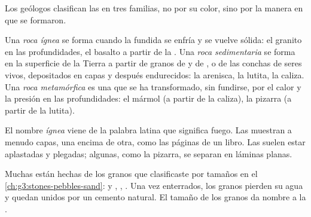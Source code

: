 Los geólogos clasifican las  en tres familias, no por su color, sino
por la manera en que se formaron.

\begin{definition}\label{def:g6:rocks-and-minerals:rock-families}
Una \emph{roca ígnea} se forma cuando la 
fundida se enfría y se vuelve sólida: el granito en las profundidades, el
basalto a partir de la .
Una \emph{roca sedimentaria} se forma en la
superficie de la Tierra a partir de granos de  y de , o de las
conchas de seres vivos, depositados en capas y después endurecidos: la
arenisca, la lutita, la caliza.
Una \emph{roca metamórfica} es una
 que se ha transformado, sin fundirse, por el calor y la presión en las
profundidades: el mármol (a partir de la caliza), la pizarra (a partir de
la lutita).
\end{definition}

El nombre \emph{ígnea} viene de la palabra latina que significa fuego. Las
 muestran a menudo capas, una encima de otra, como las
páginas de un libro. Las  suelen estar aplastadas y
plegadas; algunas, como la pizarra, se separan en láminas planas.

Muchas  están hechas de los granos que clasificaste por
tamaños en el \cref{ch:g3:stones-pebbles-sand}:  y , ,
. Una vez enterrados, los granos pierden su agua y quedan unidos por un
cemento natural. El tamaño de los granos da nombre a la .

